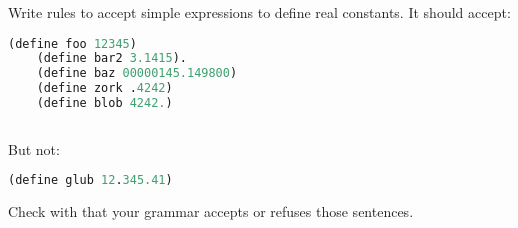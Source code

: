 \documentclass{../../../tp}
\begin{document}
\begin{instruction}
	Write rules to accept simple \scheme expressions to define real constants. It should accept:
	
	\begin{lstlisting}[language=lisp]
	(define foo 12345)
	(define bar2 3.1415).
	(define baz 00000145.149800)
	(define zork .4242)
	(define blob 4242.)
	
	\end{lstlisting}
	
	But not: 
	
	\begin{lstlisting}[language=lisp]
	(define glub 12.345.41)
	\end{lstlisting}
	
	Check with  that your grammar accepts or refuses those sentences.
\end{instruction}  

	
\end{document}
